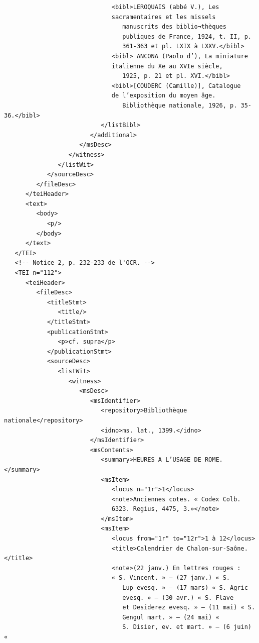 \documentclass[a4paper,12pt,twoside]{book}
\begin{document}
\begin{verbatim}
                              <bibl>LEROQUAIS (abbé V.), Les 
                              sacramentaires et les missels
                                 manuscrits des biblio¬thèques 
                                 publiques de France, 1924, t. II, p. 
                                 361-363 et pl. LXIX à LXXV.</bibl>
                              <bibl> ANCONA (Paolo d’), La miniature
                              italienne du Xe au XVIe siècle,
                                 1925, p. 21 et pl. XVI.</bibl>
                              <bibl>[COUDERC (Camille)], Catalogue 
                              de l’exposition du moyen âge.
                                 Bibliothèque nationale, 1926, p. 35-36.</bibl>
                           </listBibl>
                        </additional>
                     </msDesc>
                  </witness>
               </listWit>
            </sourceDesc>
         </fileDesc>
      </teiHeader>
      <text>
         <body>
            <p/>
         </body>
      </text>
   </TEI>
   <!-- Notice 2, p. 232-233 de l'OCR. -->
   <TEI n="112">
      <teiHeader>
         <fileDesc>
            <titleStmt>
               <title/>
            </titleStmt>
            <publicationStmt>
               <p>cf. supra</p>
            </publicationStmt>
            <sourceDesc>
               <listWit>
                  <witness>
                     <msDesc>
                        <msIdentifier>
                           <repository>Bibliothèque nationale</repository>
                           <idno>ms. lat., 1399.</idno>
                        </msIdentifier>
                        <msContents>
                           <summary>HEURES A L’USAGE DE ROME.</summary>
                           <msItem>
                              <locus n="1r">1</locus>
                              <note>Anciennes cotes. « Codex Colb.
                              6323. Regius, 4475, 3.»</note>
                           </msItem>
                           <msItem>
                              <locus from="1r" to="12r">1 à 12</locus>
                              <title>Calendrier de Chalon-sur-Saône.</title>
                              <note>(22 janv.) En lettres rouges : 
                              « S. Vincent. » — (27 janv.) « S.
                                 Lup evesq. » — (17 mars) « S. Agric 
                                 evesq. » — (30 avr.) « S. Flave
                                 et Desiderez evesq. » — (11 mai) « S. 
                                 Gengul mart. » — (24 mai) «
                                 S. Disier, ev. et mart. » — (6 juin) «

\end{verbatim}
\end{document}
